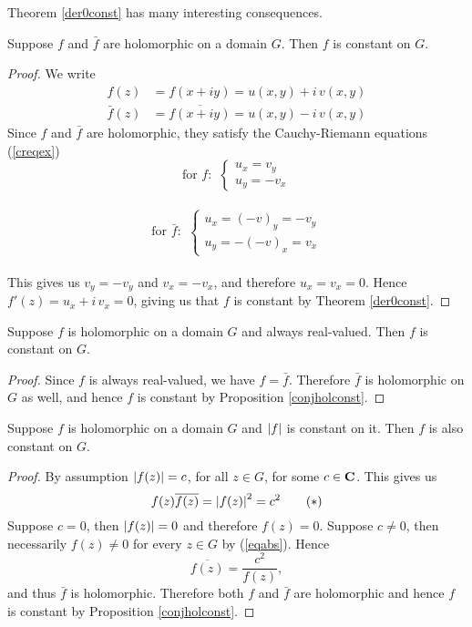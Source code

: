\vspace*{1em}

Theorem \ref{der0const} has many interesting consequences.
\begin{proposition}\label{conjholconst}
Suppose $f$ and $\bar{f}$ are holomorphic on a domain $G$. Then $f$ is constant on $G$.
\end{proposition}
\begin{proof}
We write
\begin{align*}
f(z) &= f(x + iy) = u(x,y) + i\,v(x,y)\\[0.5em]
\bar{f}(z) &= \overline{f(x + iy)} = u(x,y) - i\,v(x,y)
\end{align*}
Since $f$ and $\bar{f}$ are holomorphic, they satisfy the Cauchy-Riemann equations (\ref{creqex})
\[\text{for $f$: }\ \begin{cases}u_x = v_y\\ u_y = -v_x \end{cases}\]\\[-0.5em]
\[\text{for $\bar{f}$: }\ \begin{cases}u_x = (-v)_y = -v_y\\ u_y = -(-v)_x = v_x \end{cases}\]\\
This gives us $v_y = -v_y$ and $v_x = -v_x$, and therefore $u_x = v_x = 0$. Hence $f'(z) = u_x + i\,v_x = 0$, giving us that $f$ is constant by Theorem \ref{der0const}.
\end{proof}

\vspace*{1em}

\begin{corollary}\label{realholconst}
Suppose $f$ is holomorphic on a domain $G$ and always real-valued. Then $f$ is constant on $G$.
\end{corollary}
\begin{proof}
Since $f$ is always real-valued, we have $f = \bar{f}$. Therefore $\bar{f}$ is holomorphic on $G$ as well, and hence $f$ is constant by Proposition \ref{conjholconst}.
\end{proof}

\vspace*{1em}

\begin{corollary}\label{absholconst}
Suppose $f$ is holomorphic on a domain $G$ and $\left\lvert f\right\rvert$ is constant on it. Then $f$ is also constant on $G$.
\end{corollary}
\begin{proof}
By assumption $\left\lvert f(z)\right\rvert = c$, for all $z \in G$, for some $c \in \mathbf C$. This gives us
\[f(z)\overline{f(z)} = \left\lvert f(z)\right\rvert^2 = c^2\tag{$*$}\label{eqabs}\]
Suppose $c = 0$, then $\left\lvert f(z)\right\rvert = 0$ and therefore $f(z) = 0$. Suppose $c \neq 0$, then necessarily $f(z) \neq 0$ for every $z \in G$ by (\ref{eqabs}). Hence
\[\overline{f(z)} = \frac{c^2}{f(z)},\]
and thus $\bar{f}$ is holomorphic. Therefore both $f$ and $\bar{f}$ are holomorphic and hence $f$ is constant by Proposition \ref{conjholconst}.
\end{proof}

